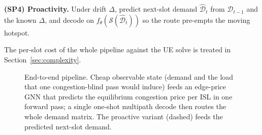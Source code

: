 \documentclass[journal]{IEEEtran}
\newcommand{\prop}{\mathrm{prop}}
\newcommand{\TTT}{\mathrm{TTT}}
\begin{document}
\noindent\textbf{(SP4) Proactivity.} Under drift $\Delta$, predict next-slot demand
$\hat{\mathcal{D}}_{t}$ from $\mathcal{D}_{t-1}$ and the known $\Delta$, and decode on
$f_\theta(\mathcal{S}(\hat{\mathcal{D}}_t))$ so the route pre-empts the moving hotspot.


The per-slot cost of the whole pipeline against the UE solve is treated in Section~\ref{sec:complexity}.

\begin{figure}[t]
\centering
\caption{End-to-end pipeline. Cheap observable state (demand and the load that one
congestion-blind pass would induce) feeds an edge-price GNN that predicts the
equilibrium congestion price per ISL in one forward pass; a single one-shot multipath
decode then routes the whole demand matrix. The proactive variant (dashed) feeds the predicted
next-slot demand.}
\label{fig:pipeline}
\end{figure}
\end{document}
